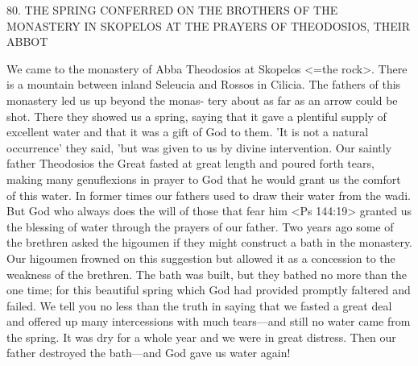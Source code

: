 80. THE SPRING CONFERRED ON THE BROTHERS OF
THE MONASTERY IN SKOPELOS AT THE PRAYERS OF
THEODOSIOS, THEIR ABBOT

We came to the monastery of Abba Theodosios at Skopelos <=the
rock>. There is a mountain between inland Seleucia and Rossos in
Cilicia. The fathers of this monastery led us up beyond the monas-
tery about as far as an arrow could be shot. There they showed us
a spring, saying that it gave a plentiful supply of excellent water and
that it was a gift of God to them. 'It is not a natural occurrence'
they said, 'but was given to us by divine intervention. Our saintly
father Theodosios the Great fasted at great length and poured forth
tears, making many genuflexions in prayer to God that he would
grant us the comfort of this water. In former times our fathers used
to draw their water from the wadi. But God who always does the
will of those that fear him <Ps 144:19> granted us the blessing of
water through the prayers of our father. Two years ago some of the
brethren asked the higoumen if they might construct a bath in the
monastery. Our higoumen frowned on this suggestion but allowed
it as a concession to the weakness of the brethren. The bath was
built, but they bathed no more than the one time; for this beautiful
spring which God had provided promptly faltered and failed. We
tell you no less than the truth in saying that we fasted a great deal
and offered up many intercessions with much tears—and still no
water came from the spring. It was dry for a whole year and we
were in great distress. Then our father destroyed the bath—and God
gave us water again!

